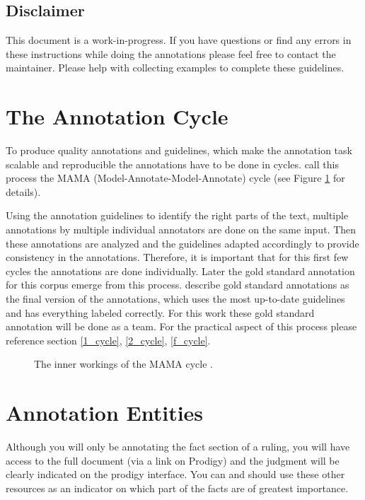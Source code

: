 \documentclass{article}
\begin{document}
\subsection{Disclaimer}
This document is a work-in-progress. If you have questions or find any errors in these instructions while doing the annotations please feel free to contact the maintainer. Please help with collecting examples to complete these guidelines.

\section{The Annotation Cycle}
To produce quality annotations and guidelines, which make the annotation task scalable and reproducible the annotations have to be done in cycles. \cite{pustejovsky2012natural} call this process the MAMA (Model-Annotate-Model-Annotate) cycle (see Figure \ref{MAMA_cycle} for details). 

Using the annotation guidelines to identify the right parts of the text, multiple annotations by multiple individual annotators are done on the same input. Then these annotations are analyzed and the guidelines adapted accordingly to provide consistency in the annotations. Therefore, it is important that for this first few cycles the annotations are done individually. Later the gold standard annotation for this corpus emerge from this process. \cite{pustejovsky2012natural} describe gold standard annotations as the final version of the annotations, which uses the most up-to-date guidelines and has everything labeled correctly. For this work these gold standard annotation will be done as a team. For the practical aspect of this process please reference section \ref{1_cycle},  \ref{2_cycle}, \ref{f_cycle}. 

\begin{figure}[H]
     \caption{The inner workings of the MAMA cycle \citep{pustejovsky2012natural}.}
     \label{MAMA_cycle}
\end{figure}

\section{Annotation Entities}
Although you will only be annotating the fact section of a ruling, you will have access to the full document (via a link on Prodigy) and the judgment will be clearly indicated on the prodigy interface. You can and should use these other resources as an indicator on which part of the facts are of greatest importance.
\end{document}
